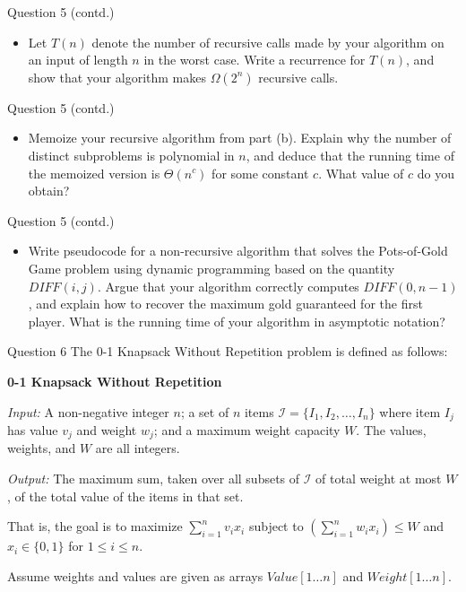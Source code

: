 \documentclass{beamer}
\begin{document}
\begin{frame}{Question 5 (contd.)}
\begin{itemize}
   \item[(c)] Let $T(n)$ denote the number of recursive calls made by your algorithm on an input of length $n$ in the worst case. Write a recurrence for $T(n)$, and show that your algorithm makes $\Omega(2^n)$ recursive calls.
\end{itemize}
\end{frame}

\begin{frame}{Question 5 (contd.)}
\begin{itemize}
  \item[(d)] Memoize your recursive algorithm from part (b). Explain why the number of distinct subproblems is polynomial in $n$, and deduce that the running time of the memoized version is $\Theta(n^c)$ for some constant $c$. What value of $c$ do you obtain?
\end{itemize}
\end{frame}

\begin{frame}{Question 5 (contd.)}
\begin{itemize}
  \item[(e)] Write pseudocode for a non-recursive algorithm that solves the Pots-of-Gold Game problem using dynamic programming based on the quantity $DIFF(i,j)$. Argue that your algorithm correctly computes $DIFF(0, n-1)$, and explain how to recover the maximum gold guaranteed for the first player. What is the running time of your algorithm in asymptotic notation?
\end{itemize}
\end{frame}


\begin{frame}{Question 6}
The 0-1 Knapsack Without Repetition problem is defined as follows:

\medskip
\textbf{0-1 Knapsack Without Repetition}

\textit{Input:} A non-negative integer $n$; a set of $n$ items $\mathcal{I} = \{I_1, I_2, \ldots, I_n\}$ where item $I_j$ has value $v_j$ and weight $w_j$; and a maximum weight capacity $W$. The values, weights, and $W$ are all integers.

\textit{Output:} The maximum sum, taken over all subsets of $\mathcal{I}$ of total weight at most $W$, of the total value of the items in that set.

That is, the goal is to maximize $\sum_{i=1}^{n} v_i x_i$ subject to $\left(\sum_{i=1}^{n} w_i x_i\right) \leq W$ and $x_i \in \{0,1\}$ for $1 \leq i \leq n$.

\medskip
Assume weights and values are given as arrays $Value[1\ldots n]$ and $Weight[1\ldots n]$.
\end{frame}
\end{document}
